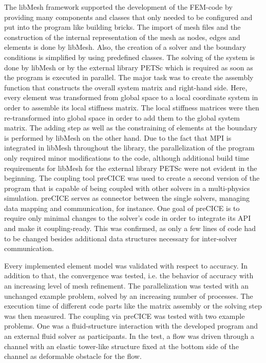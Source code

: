   The libMesh framework supported the development of the FEM-code by providing many components and classes that only needed to be configured and put into the program like building bricks. The import of mesh files and the construction of the internal representation of the mesh as nodes, edges and elements is done by libMesh. Also, the creation of a solver and the boundary conditions is simplified by using predefined classes. The solving of the system is done by libMesh or by the external library PETSc which is required as soon as the program is executed in parallel. The major task was to create the assembly function that constructs the overall system matrix and right-hand side. Here, every element was transformed from global space to a local coordinate system in order to assemble its local stiffness matrix. The local stiffness matrices were then re-transformed into global space in order to add them to the global system matrix. The adding step as well as the constraining of elements at the boundary is performed by libMesh on the other hand. Due to the fact that MPI is integrated in libMesh throughout the library, the parallelization of the program only required minor modifications to the code, although additional build time requirements for libMesh for the external library PETSc were not evident in the beginning.
  The coupling tool preCICE was used to create a second version of the program that is capable of being coupled with other solvers in a multi-physics simulation. preCICE serves as connector between the single solvers, managing data mapping and communication, for instance. One goal of preCICE is to require only minimal changes to the solver's code in order to integrate its API and make it coupling-ready. This was confirmed, as only a few lines of code had to be changed besides additional data structures necessary for inter-solver communication.

  Every implemented element model was validated with respect to accuracy. In addition to that, the convergence was tested, i.e. the behavior of accuracy with an increasing level of mesh refinement. The parallelization was tested with an unchanged example problem, solved by an increasing number of processes. The execution time of different code parts like the matrix assembly or the solving step was then measured. The coupling via preCICE was tested with two example problems. One was a fluid-structure interaction with the developed program and an external fluid solver as participants. In the test, a flow was driven through a channel with an elastic tower-like structure fixed at the bottom side of the channel as deformable obstacle for the flow.
 
